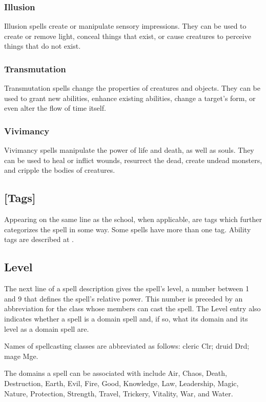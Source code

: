         \subsubsection{Illusion}
            Illusion spells create or manipulate sensory impressions.
            They can be used to create or remove light, conceal things that exist, or cause creatures to perceive things that do not exist.

        \subsubsection{Transmutation}
            Transmutation spells change the properties of creatures and objects.
            They can be used to grant new abilities, enhance existing abilities, change a target's form, or even alter the flow of time itself.

        \subsubsection{Vivimancy}
            Vivimancy spells manipulate the power of life and death, as well as souls.
            They can be used to heal or inflict wounds, resurrect the dead, create undead monsters, and cripple the bodies of creatures.

    \subsection{[Tags]}
        Appearing on the same line as the school, when applicable, are tags which further categorizes the spell in some way.
        Some spells have more than one tag.
        Ability tags are described at .

    \subsection{Level}
        The next line of a spell description gives the spell's level, a number between 1 and 9 that defines the spell's relative power.
        This number is preceded by an abbreviation for the class whose members can cast the spell.
        The Level entry also indicates whether a spell is a domain spell and, if so, what its domain and its level as a domain spell are.

        Names of spellcasting classes are abbreviated as follows: cleric Clr; druid Drd; mage Mge.

        The domains a spell can be associated with include Air, Chaos, Death, Destruction, Earth, Evil, Fire, Good, Knowledge, Law, Leadership, Magic, Nature, Protection, Strength, Travel, Trickery, Vitality, War, and Water.

